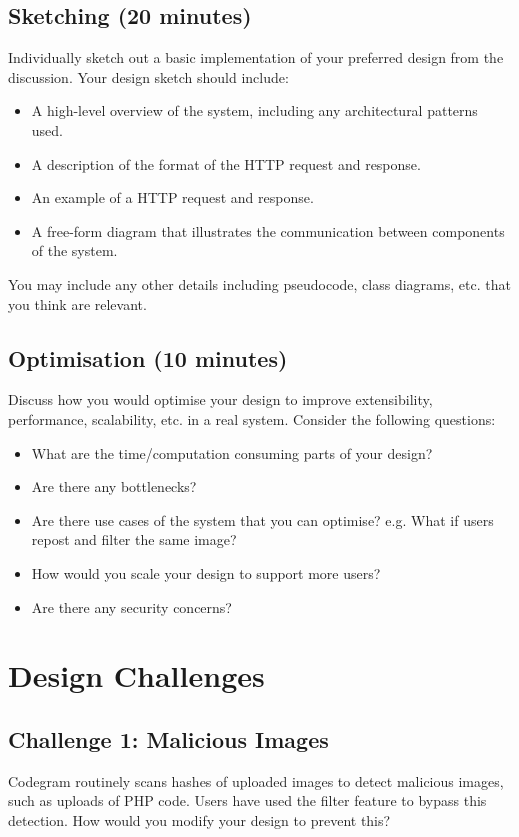 \documentclass{csse4400}
\begin{document}
\subsection*{Sketching (20 minutes)}
Individually sketch out a basic implementation of your preferred design from the discussion.
Your design sketch should include:
\begin{itemize}
    \item A high-level overview of the system, including any architectural patterns used.
    \item A description of the format of the HTTP request and response.
    \item An example of a HTTP request and response.
    \item A free-form diagram that illustrates the communication between components of the system.
\end{itemize}
You may include any other details including pseudocode, class diagrams, etc. that you think are relevant.

\subsection*{Optimisation (10 minutes)}
Discuss how you would optimise your design to improve extensibility, performance, scalability, etc. in a real system.
Consider the following questions:
\begin{itemize}
    \item What are the time/computation consuming parts of your design?
    \item Are there any bottlenecks?
    \item Are there use cases of the system that you can optimise? e.g. What if users repost and filter the same image?
    \item How would you scale your design to support more users?
    \item Are there any security concerns?
\end{itemize}


\section{Design Challenges}

\subsection*{Challenge 1: Malicious Images}
Codegram routinely scans hashes of uploaded images to detect malicious images, such as uploads of PHP code.
Users have used the filter feature to bypass this detection.
How would you modify your design to prevent this?
\end{document}
